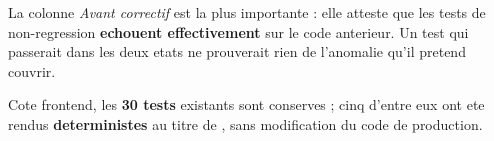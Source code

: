 \vspace{5pt}
La colonne \emph{Avant correctif} est la plus importante : elle atteste que les tests de
non-regression \textbf{echouent effectivement} sur le code anterieur. Un test qui passerait dans les
deux etats ne prouverait rien de l'anomalie qu'il pretend couvrir.

\vspace{5pt}
Cote frontend, les \textbf{30 tests} existants sont conserves ; cinq d'entre eux ont ete rendus
\textbf{deterministes} au titre de , sans modification du code de production.
